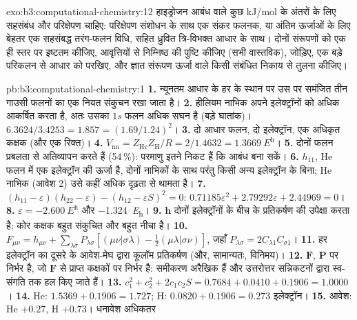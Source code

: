 \begin{solution}{exo:b3:computational-chemistry:12}
हाइड्रोजन आबंध वाले कुछ \unit{kJ/mol} के अंतरों के लिए सहसंबंध और
परिक्षेपण चाहिए: परिक्षेपण संशोधन के साथ एक संकर फलनक, या अंतिम ऊर्जाओं के लिए
बेहतर एक सहसंबद्ध तरंग-फलन विधि,  सहित ध्रुवित
त्रि-विभक्त आधार के साथ। दोनों संरूपणों को
एक ही स्तर पर इष्टतम कीजिए, आवृत्तियों से निम्निष्ठ की पुष्टि कीजिए (सभी वास्तविक),  जोड़िए, एक बड़े परिकलन से आधार को परखिए, और ज्ञात संरूपण ऊर्जा वाले
किसी संबंधित निकाय से तुलना कीजिए।
\end{solution}

\begin{solution}{pb:b3:computational-chemistry:1}
\textbf{1.} न्यूनतम आधार के हर  के स्थान पर उस पर समंजित तीन
गाउसी फलनों का एक नियत संकुचन रखा जाता है।
\textbf{2.} हीलियम नाभिक अपने इलेक्ट्रॉनों को अधिक आकर्षित करता है, अतः उसका $1s$ फलन
अधिक सघन है (बड़े घातांक)। $6.3624/3.4253 = 1.857 = (1.69/1.24)^2$।
\textbf{3.} दो आधार फलन, दो इलेक्ट्रॉन, एक अधिकृत कक्षक (और एक
रिक्त)।
\textbf{4.} $V_{\mathrm{nn}} = Z_{\mathrm{He}}Z_{\mathrm H}/R = 2/1.4632 =
\qty{1.3669}{\hartree}$।
\textbf{5.} दोनों फलन प्रबलता से अतिव्यापन करते हैं (54\,\%): परमाणु इतने
निकट हैं कि आबंध बना सकें।
\textbf{6.} $h_{11}$, He फलन में एक इलेक्ट्रॉन की ऊर्जा है, दोनों
नाभिकों के साथ परंतु किसी अन्य इलेक्ट्रॉन के बिना; He नाभिक (आवेश 2) उसे कहीं अधिक
दृढ़ता से थामता है।
\textbf{7.} $(h_{11} - \varepsilon)(h_{22} - \varepsilon) - (h_{12} - \varepsilon S)^2 = 0$:
$0.71185\varepsilon^2 + 2.79292\varepsilon + 2.44969 = 0$।
\textbf{8.} $\varepsilon = \qty{-2.600}{\hartree}$ और \qty{-1.324}{\hartree}।
\textbf{9.} $\mathbf h$ दोनों इलेक्ट्रॉनों के बीच के प्रतिकर्षण की उपेक्षा करता है; कोर
कक्षक बहुत संकुचित और बहुत नीचा है।
\textbf{10.} $F_{\mu\nu} = h_{\mu\nu} + \sum_{\lambda\sigma}P_{\lambda\sigma}[(\mu\nu|\sigma\lambda) -
\frac12(\mu\lambda|\sigma\nu)]$, जहाँ $P_{\lambda\sigma} = 2C_{\lambda1}C_{\sigma1}$।
\textbf{11.} हर इलेक्ट्रॉन का दूसरे के आवेश-मेघ द्वारा कूलॉम प्रतिकर्षण (और,
सामान्यतः, विनिमय)।
\textbf{12.} $\mathbf F$, $\mathbf P$ पर निर्भर है, जो
$\mathbf F$ से प्राप्त कक्षकों पर निर्भर है: समीकरण अरैखिक हैं और उत्तरोत्तर
सन्निकटनों द्वारा स्व-संगति तक हल किए जाते हैं।
\textbf{13.} $c_1^2 + c_2^2 + 2c_1c_2S = 0.7684 + 0.0410 + 0.1906 = 1.0000$।
\textbf{14.} He: $1.5369 + 0.1906 = 1.727$; H: $0.0820 + 0.1906 = 0.273$
इलेक्ट्रॉन।
\textbf{15.} आवेश: He $+0.27$, H $+0.73$। धनावेश अधिकतर

\end{solution}

